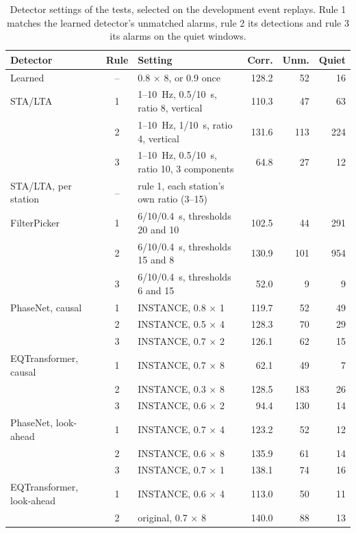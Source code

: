 \documentclass[a4paper,fleqn]{cas-sc}
\newcommand{\stalta}{STA/LTA}
\begin{document}
\begin{table}
  \centering\small
  \caption{Detector settings of the tests, selected on the development event replays.
    Rule 1 matches the learned detector's unmatched alarms, rule 2 its detections and
  rule 3 its alarms on the quiet windows.}\label{tab:settings}
  \setlength{\tabcolsep}{4pt}
  \begin{tabular}{@{}L{4.1cm}cL{5.7cm}rrr@{}}
    \toprule
    Detector & Rule & Setting & Corr. & Unm. & Quiet \\
    \midrule
    Learned & -- & 0.8 $\times$ 8, or 0.9 once & 128.2 & 52 & 16 \\
    \addlinespace
    \stalta{} & 1 & 1--10~Hz, 0.5/10~s, ratio 8, vertical & 110.3 & 47 & 63 \\
    & 2 & 1--10~Hz, 1/10~s, ratio 4, vertical & 131.6 & 113 & 224 \\
    & 3 & 1--10~Hz, 0.5/10~s, ratio 10, 3 components & 64.8 & 27 & 12 \\
    \stalta{}, per station & -- & rule 1, each station's own ratio (3--15) & & & \\
    \addlinespace
    FilterPicker & 1 & 6/10/0.4~s, thresholds 20 and 10 & 102.5 & 44 & 291 \\
    & 2 & 6/10/0.4~s, thresholds 15 and 8 & 130.9 & 101 & 954 \\
    & 3 & 6/10/0.4~s, thresholds 6 and 15 & 52.0 & 9 & 9 \\
    \addlinespace
    PhaseNet, causal & 1 & INSTANCE, 0.8 $\times$ 1 & 119.7 & 52 & 49 \\
    & 2 & INSTANCE, 0.5 $\times$ 4 & 128.3 & 70 & 29 \\
    & 3 & INSTANCE, 0.7 $\times$ 2 & 126.1 & 62 & 15 \\
    \addlinespace
    EQTransformer, causal & 1 & INSTANCE, 0.7 $\times$ 8 & 62.1 & 49 & 7 \\
    & 2 & INSTANCE, 0.3 $\times$ 8 & 128.5 & 183 & 26 \\
    & 3 & INSTANCE, 0.6 $\times$ 2 & 94.4 & 130 & 14 \\
    \addlinespace
    PhaseNet, look-ahead & 1 & INSTANCE, 0.7 $\times$ 4 & 123.2 & 52 & 12 \\
    & 2 & INSTANCE, 0.6 $\times$ 8 & 135.9 & 61 & 14 \\
    & 3 & INSTANCE, 0.7 $\times$ 1 & 138.1 & 74 & 16 \\
    \addlinespace
    EQTransformer, look-ahead & 1 & INSTANCE, 0.6 $\times$ 4 & 113.0 & 50 & 11 \\
    & 2 & original, 0.7 $\times$ 8 & 140.0 & 88 & 13 \\

\end{tabular}
\end{table}
\end{document}
